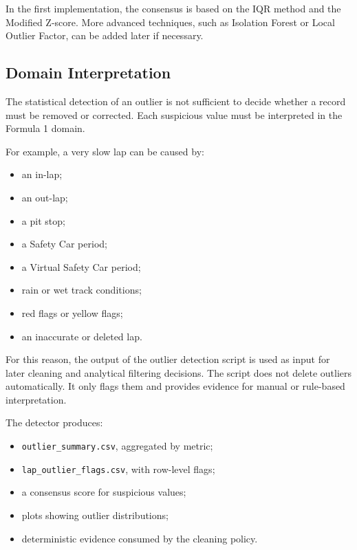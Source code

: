 \documentclass[a4paper,11pt]{article}
\begin{document}
	In the first implementation, the consensus is based on the IQR method and the Modified
	Z-score. More advanced techniques, such as Isolation Forest or Local Outlier Factor, can
	be added later if necessary.
	
	\subsection{Domain Interpretation}
	
	The statistical detection of an outlier is not sufficient to decide whether a record must be
	removed or corrected. Each suspicious value must be interpreted in the Formula 1 domain.
	
	For example, a very slow lap can be caused by:
	
	\begin{itemize}
		\item an in-lap;
		\item an out-lap;
		\item a pit stop;
		\item a Safety Car period;
		\item a Virtual Safety Car period;
		\item rain or wet track conditions;
		\item red flags or yellow flags;
		\item an inaccurate or deleted lap.
	\end{itemize}
	
	For this reason, the output of the outlier detection script is used as input for later
	cleaning and analytical filtering decisions. The script does not delete outliers
	automatically. It only flags them and provides evidence for manual or rule-based
	interpretation.
	
	The detector produces:
	
	\begin{itemize}
		\item \texttt{outlier\_summary.csv}, aggregated by metric;
		\item \texttt{lap\_outlier\_flags.csv}, with row-level flags;
		\item a consensus score for suspicious values;
		\item plots showing outlier distributions;
		\item deterministic evidence consumed by the cleaning policy.
	\end{itemize}
\end{document}
